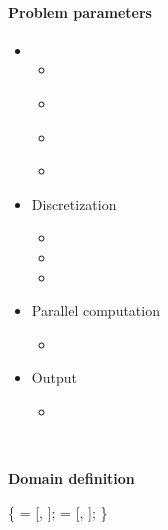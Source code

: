 \begin{frame}[fragile] 
\secframetitle{\ssParameters}
\framesubtitle{Problem parameters}
\vspace{-0.2in}
\begin{minipage}[t]{1.7in}
\begin{itemize}
\item {}
  \begin{itemize}
  \item {}
  \item \textcolor{blue}{}
  \item \textcolor{blue}{}
  \item \textcolor{blue}{}
  \end{itemize}
\item Discretization
  \begin{itemize}
  \item {}
  \item {}
  \item {}
  \end{itemize}
\item Parallel computation
  \begin{itemize}
  \item {}
  \end{itemize}
\item Output
  \begin{itemize}
    \item {}
  \end{itemize}
\end{itemize}
\end{minipage} \
\begin{minipage}[t]{2.6in}
\vspace{-0.2in}
\begin{block}{\textbf{Domain definition}}
\footnotesize \vspace{-0.1in}
\begin{semiverbatim}
 \{
    = [, ];
    = [, \valuetext{0.3}];
\} 
\end{semiverbatim}
\end{block}
\end{minipage}
\end{frame}


